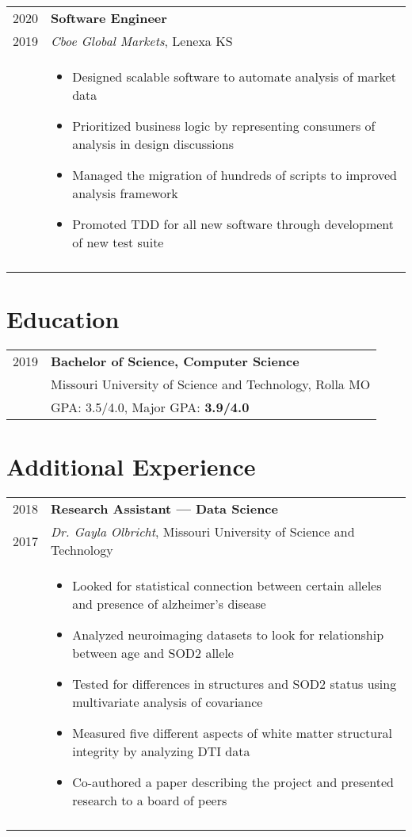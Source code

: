 \documentclass[a4paper,10pt]{article}
\newcommand{\br}{\\\multicolumn{2}{c}{}}
\begin{document}
\begin{tabular}{r|p{15cm}}
    \textsc{2020}   & \textbf{Software Engineer} \\
    \textsc{2019}  & \textit{Cboe Global Markets}, Lenexa KS \\ &
    \begin{itemize}
    \item Designed scalable software to automate analysis of market data
    \item Prioritized business logic by representing consumers of analysis in design discussions
    \item Managed the migration of hundreds of scripts to improved analysis framework
    \item Promoted TDD for all new software through development of new test suite

    \end{itemize} \br\\

\end{tabular}

\section{Education}
\begin{tabular}{r|p{15cm}}
  \textsc{2019} & \textbf{Bachelor of Science, Computer Science} \\
                & Missouri University of Science and Technology, Rolla MO  \\
                & GPA: 3.5/4.0, Major GPA: \textbf{3.9/4.0} \\
\end{tabular}

\section{Additional Experience}
\begin{tabular}{r|p{15cm}}
    \textsc{2018} & \textbf{Research Assistant --- Data Science} \\
    \textsc{2017} & \textit{Dr. Gayla Olbricht}, Missouri University of Science and Technology \\ &
    \begin{itemize}
    \item Looked for statistical connection between certain alleles and presence of alzheimer's disease
    \item Analyzed neuroimaging datasets to look for relationship between age and SOD2 allele
    \item Tested for differences in structures and SOD2 status using multivariate analysis of covariance
    \item Measured five different aspects of white matter structural integrity by analyzing DTI data
    \item Co-authored a paper describing the project and presented research to a board of peers
    \end{itemize} \br\\

\end{tabular}
\end{document}
